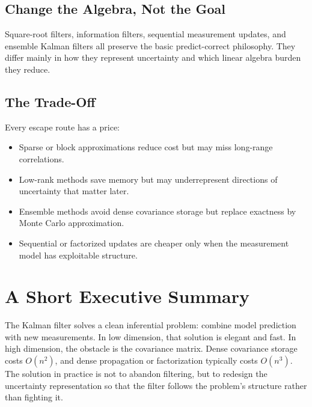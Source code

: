 \documentclass[12pt,a4paper]{article}
\begin{document}
\subsection{Change the Algebra, Not the Goal}

Square-root filters, information filters, sequential measurement updates, and ensemble Kalman filters all preserve the basic predict-correct philosophy. They differ mainly in how they represent uncertainty and which linear algebra burden they reduce.

\subsection{The Trade-Off}

Every escape route has a price:
\begin{itemize}
  \item Sparse or block approximations reduce cost but may miss long-range correlations.
  \item Low-rank methods save memory but may underrepresent directions of uncertainty that matter later.
  \item Ensemble methods avoid dense covariance storage but replace exactness by Monte Carlo approximation.
  \item Sequential or factorized updates are cheaper only when the measurement model has exploitable structure.
\end{itemize}


\section{A Short Executive Summary}

The Kalman filter solves a clean inferential problem: combine model prediction with new measurements. In low dimension, that solution is elegant and fast. In high dimension, the obstacle is the covariance matrix. Dense covariance storage costs \(O(n^2)\), and dense propagation or factorization typically costs \(O(n^3)\). The solution in practice is not to abandon filtering, but to redesign the uncertainty representation so that the filter follows the problem's structure rather than fighting it.

\appendix
\end{document}
